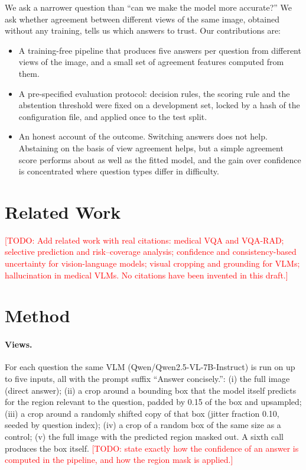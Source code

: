 \documentclass[11pt]{article}
\newcommand{\todo}[1]{\textcolor{red}{[TODO: #1]}}
\begin{document}
We ask a narrower question than ``can we make the model more accurate?'' We ask whether agreement between different views of the same image, obtained without any training, tells us which answers to trust. Our contributions are:
\begin{itemize}
\item A training-free pipeline that produces five answers per question from different views of the image, and a small set of agreement features computed from them.
\item A pre-specified evaluation protocol: decision rules, the scoring rule and the abstention threshold were fixed on a development set, locked by a hash of the configuration file, and applied once to the test split.
\item An honest account of the outcome. Switching answers does not help. Abstaining on the basis of view agreement helps, but a simple agreement score performs about as well as the fitted model, and the gain over confidence is concentrated where question types differ in difficulty.
\end{itemize}

\section{Related Work}
\todo{Add related work with real citations: medical VQA and VQA-RAD; selective prediction and risk--coverage analysis; confidence and consistency-based uncertainty for vision-language models; visual cropping and grounding for VLMs; hallucination in medical VLMs. No citations have been invented in this draft.}

\section{Method}
\paragraph{Views.} For each question the same VLM (Qwen/Qwen2.5-VL-7B-Instruct) is run on up to five inputs, all with the prompt suffix ``Answer concisely.'': (i) the full image (direct answer); (ii) a crop around a bounding box that the model itself predicts for the region relevant to the question, padded by 0.15 of the box and upsampled; (iii) a crop around a randomly shifted copy of that box (jitter fraction 0.10, seeded by question index); (iv) a crop of a random box of the same size as a control; (v) the full image with the predicted region masked out. A sixth call produces the box itself. \todo{state exactly how the confidence of an answer is computed in the pipeline, and how the region mask is applied.}
\end{document}
